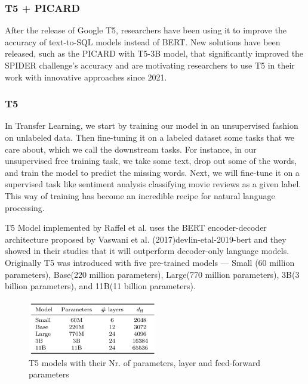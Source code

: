 \subsubsection{T5 + PICARD} \label{picard}


After the release of Google T5, researchers have been using it to improve the accuracy of text-to-SQL models instead of BERT. New solutions have been released, such as the PICARD with T5-3B model, that significantly improved the SPIDER challenge's accuracy and are motivating researchers to use T5 in their work with innovative approaches since 2021.

\subsubsection*{T5}

In Transfer Learning, we start by training our model in an unsupervised fashion on unlabeled data. Then fine-tuning it on a labeled dataset some tasks that we care about, which we call the downstream tasks. For instance, in our unsupervised free training task, we take some text, drop out some of the words, and train the model to predict the missing words. Next, we will fine-tune it on a supervised task like sentiment analysis classifying movie reviews as a given label. This way of training has become an incredible recipe for natural language processing.

\ac{T5} Model implemented by Raffel et al. \cite{raffel_exploring_2020} uses the BERT encoder-decoder architecture proposed by Vaswani et al. (2017){devlin-etal-2019-bert} and they showed in their studies that it will outperform decoder-only language models. Originally T5 was introduced with five pre-trained models — Small (60 million parameters), Base(220 million parameters), Large(770 million parameters), 3B(3 billion parameters), and 11B(11 billion parameters)\cite{raffel_exploring_2020}.

\begin{figure}[h]
    \centering
    \includegraphics[width=0.5\textwidth]{pics/picard/t5-size.png}
    \caption{T5 models with their Nr. of parameters, layer and feed-forward parameters\cite{raffel_exploring_2020}}
\end{figure}


